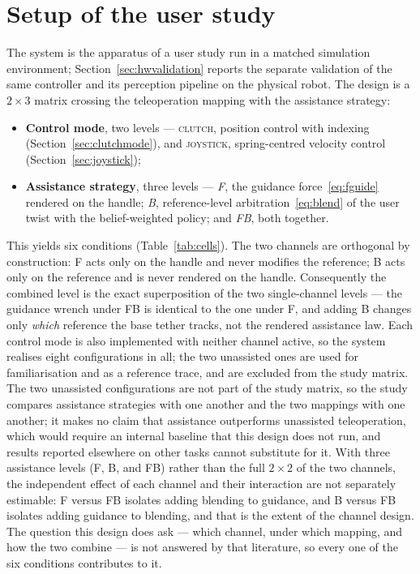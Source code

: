 \section{Setup of the user study}
\label{sec:study}

The system is the apparatus of a user study run in a matched simulation environment; Section~\ref{sec:hwvalidation} reports the separate validation of the same controller and its perception pipeline on the physical robot. The design is a $2\times3$ matrix crossing the teleoperation mapping with the assistance strategy:
\begin{itemize}[nosep]
\item \textbf{Control mode}, two levels --- \textsc{clutch}, position control with indexing (Section~\ref{sec:clutchmode}), and \textsc{joystick}, spring-centred velocity control (Section~\ref{sec:joystick});
\item \textbf{Assistance strategy}, three levels --- \emph{F}, the guidance force~\eqref{eq:fguide} rendered on the handle; \emph{B}, reference-level arbitration~\eqref{eq:blend} of the user twist with the belief-weighted policy; and \emph{FB}, both together.
\end{itemize}
This yields six conditions (Table~\ref{tab:cells}). The two channels are orthogonal by construction: F acts only on the handle and never modifies the reference; B acts only on the reference and is never rendered on the handle. Consequently the combined level is the exact superposition of the two single-channel levels --- the guidance wrench under FB is identical to the one under F, and adding B changes only \emph{which} reference the base tether tracks, not the rendered assistance law. Each control mode is also implemented with neither channel active, so the system realises eight configurations in all; the two unassisted ones are used for familiarisation and as a reference trace, and are excluded from the study matrix. The two unassisted configurations are not part of the study matrix, so the study compares assistance strategies with one another and the two mappings with one another; it makes no claim that assistance outperforms unassisted teleoperation, which would require an internal baseline that this design does not run, and results reported elsewhere on other tasks cannot substitute for it. With three assistance levels (F, B, and FB) rather than the full $2\times2$ of the two channels, the independent effect of each channel and their interaction are not separately estimable: F versus FB isolates adding blending to guidance, and B versus FB isolates adding guidance to blending, and that is the extent of the channel design. The question this design does ask --- which channel, under which mapping, and how the two combine --- is not answered by that literature, so every one of the six conditions contributes to it.

